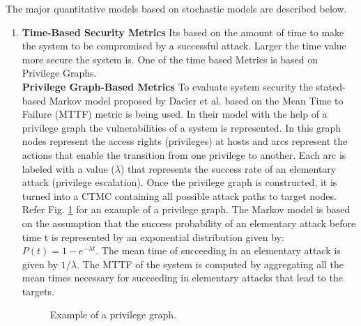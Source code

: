 \documentclass[pdftex,english,oribibl]{llncs}
\begin{document}
The major quantitative models based on stochastic models are described below.
\begin{enumerate}[(1)]
	\item {\textbf{Time-Based Security Metrics}\newline 
	Its based on the amount of time to make the system to be compromised by a successful attack. Larger the time value more secure the system is. One of the time based Metrics is based on Privilege Graphs.\\
    \textbf{Privilege Graph-Based Metrics}\newline 
	To evaluate system security the stated-based Markov model proposed by Dacier et al. \cite{Dacier1996QuantitativeAO} based on the Mean Time to Failure (MTTF) metric is being used. In their model with the help of a privilege graph the vulnerabilities of a system is represented. In this graph nodes represent the access rights (privileges) at hosts and arcs represent the actions that enable the transition from one privilege to another. Each arc is labeled with a value ($\lambda$) that represents the success rate of an elementary attack (privilege escalation). Once the privilege graph is constructed, it is turned into a CTMC containing all possible attack paths to target nodes. Refer Fig. \ref{fig:privilege_graph_example} for an example of a privilege graph.  The Markov model is based on the assumption that the success probability of an elementary attack before time t is represented by an exponential distribution given by: $P(t) = 1 - e^{-\lambda t}$. The mean time of succeeding in an elementary attack is given by $1/\lambda$. The MTTF of the system is computed by aggregating all the mean times necessary for succeeding in elementary attacks that lead to the targets.\\
		
	\begin{figure}[h]
		\centering
		\caption{Example of a privilege graph.}
		\label{fig:privilege_graph_example}
	\end{figure}
		
}
\end{enumerate}
\end{document}
